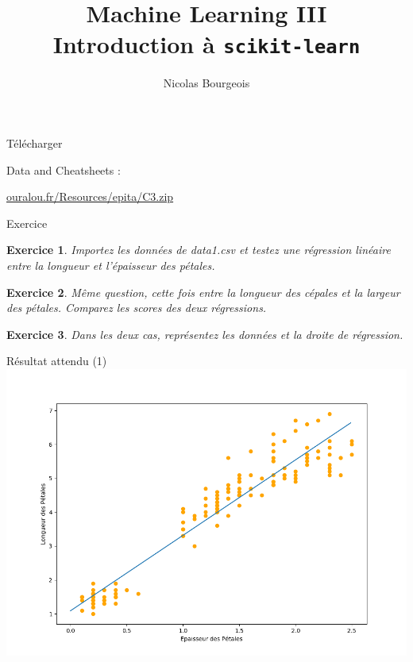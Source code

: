 \documentclass[11pt]{beamer}
\title{Machine Learning III \\ Introduction à \texttt{scikit-learn}}
\author{Nicolas Bourgeois}
\date{}
\newtheorem{exercice}{Exercice}
\begin{document}
\begin{frame}
\maketitle
\end{frame}

\begin{frame}{Télécharger}

Data and Cheatsheets :\\
\vspace{0.3cm}

\url{ouralou.fr/Resources/epita/C3.zip}


\end{frame}


\begin{frame}{Exercice}
\begin{exercice}
Importez les données de data1.csv et testez une régression linéaire entre la longueur et l'épaisseur des pétales.
\end{exercice}
\begin{exercice}
Même question, cette fois entre la longueur des cépales et la largeur des pétales. Comparez les scores des deux régressions.
\end{exercice}
\begin{exercice}
Dans les deux cas, représentez les données et la droite de régression.
\end{exercice}
\end{frame}

\begin{frame}{Résultat attendu (1)}
\includegraphics[scale=0.42]{ex302}
\end{frame}
\end{document}
